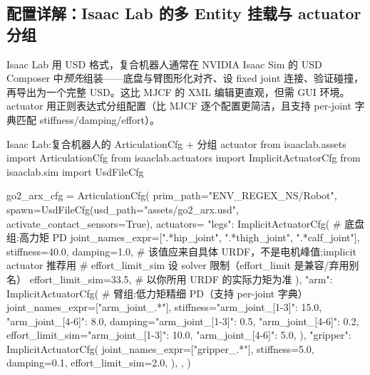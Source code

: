 \subsection{配置详解：Isaac Lab 的多 Entity 挂载与 actuator 分组}
\label{sec:rlmc-lm-isaaclab-asset}

Isaac Lab 用 USD 格式，复合机器人通常在 NVIDIA Isaac Sim 的 USD Composer 中\emph{预先}组装——底盘与臂图形化对齐、设 fixed joint 连接、验证碰撞，再导出为一个完整 USD。这比 MJCF 的 XML 编辑更直观，但需 GUI 环境。actuator 用正则表达式分组配置（比 MJCF 逐个配置更简洁，且支持 per-joint 字典匹配 stiffness/damping/effort）。

\begin{codebox}[Python]{Isaac Lab:复合机器人的 ArticulationCfg + 分组 actuator}
from isaaclab.assets import ArticulationCfg
from isaaclab.actuators import ImplicitActuatorCfg
from isaaclab.sim import UsdFileCfg

go2_arx_cfg = ArticulationCfg(
    prim_path="{ENV_REGEX_NS}/Robot",
    spawn=UsdFileCfg(usd_path="assets/go2_arx.usd", activate_contact_sensors=True),
    actuators={
        "legs": ImplicitActuatorCfg(        # 底盘组:高力矩 PD
            joint_names_expr=[".*hip_joint", ".*thigh_joint", ".*calf_joint"],
            stiffness=40.0, damping=1.0,
            # 该值应来自具体 URDF，不是电机峰值;implicit actuator 推荐用
            # effort_limit_sim 设 solver 限制（effort_limit 是兼容/弃用别名）
            effort_limit_sim=33.5,          # 以你所用 URDF 的实际力矩为准
        ),
        "arm": ImplicitActuatorCfg(         # 臂组:低力矩精细 PD（支持 per-joint 字典）
            joint_names_expr=["arm_joint_.*"],
            stiffness={"arm_joint_[1-3]": 15.0, "arm_joint_[4-6]": 8.0},
            damping={"arm_joint_[1-3]": 0.5,  "arm_joint_[4-6]": 0.2},
            effort_limit_sim={"arm_joint_[1-3]": 10.0, "arm_joint_[4-6]": 5.0},
        ),
        "gripper": ImplicitActuatorCfg(
            joint_names_expr=["gripper_.*"], stiffness=5.0, damping=0.1,
            effort_limit_sim=2.0,
        ),
    },
)
\end{codebox}

